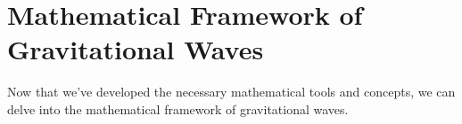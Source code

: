 \chapter{Mathematical Framework of Gravitational Waves}
\label{chap:2}

Now that we've developed the necessary mathematical tools and concepts, we can delve into the mathematical framework of gravitational waves.






